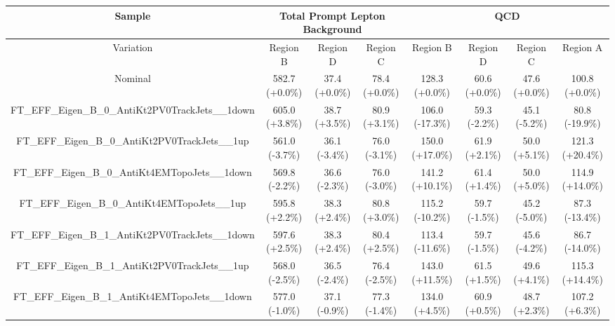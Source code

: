 \begin{table}[htbp!]
\begin{tiny}
\begin{center}
\begin{tabular}{c|c|c|c||c|c|c|c}
Sample                                                          &\multicolumn{3}{c||}{Total Prompt Lepton Background}      &\multicolumn{4}{c}{QCD}                                                  \\
\hline  
Variation                                                       & Region B       & Region D         & Region C           & Region B        & Region D         & Region C          & Region A         \\ 
\hline  
Nominal                                                         & 582.7     (+0.0\%) & 37.4      (+0.0\%) & 78.4      (+0.0\%) & 128.3     (+0.0\%) & 60.6      (+0.0\%) & 47.6      (+0.0\%) & 100.8     (+0.0\%) \\ 
\hline
FT\_EFF\_Eigen\_B\_0\_AntiKt2PV0TrackJets\_\_1down           & 605.0     (+3.8\%) & 38.7      (+3.5\%) & 80.9      (+3.1\%) & 106.0     (-17.3\%) & 59.3      (-2.2\%) & 45.1      (-5.2\%) & 80.8      (-19.9\%) \\ 
FT\_EFF\_Eigen\_B\_0\_AntiKt2PV0TrackJets\_\_1up             & 561.0     (-3.7\%) & 36.1      (-3.4\%) & 76.0      (-3.1\%) & 150.0     (+17.0\%) & 61.9      (+2.1\%) & 50.0      (+5.1\%) & 121.3     (+20.4\%) \\ 
FT\_EFF\_Eigen\_B\_0\_AntiKt4EMTopoJets\_\_1down             & 569.8     (-2.2\%) & 36.6      (-2.3\%) & 76.0      (-3.0\%) & 141.2     (+10.1\%) & 61.4      (+1.4\%) & 50.0      (+5.0\%) & 114.9     (+14.0\%) \\ 
FT\_EFF\_Eigen\_B\_0\_AntiKt4EMTopoJets\_\_1up               & 595.8     (+2.2\%) & 38.3      (+2.4\%) & 80.8      (+3.0\%) & 115.2     (-10.2\%) & 59.7      (-1.5\%) & 45.2      (-5.0\%) & 87.3      (-13.4\%) \\ 
FT\_EFF\_Eigen\_B\_1\_AntiKt2PV0TrackJets\_\_1down           & 597.6     (+2.5\%) & 38.3      (+2.4\%) & 80.4      (+2.5\%) & 113.4     (-11.6\%) & 59.7      (-1.5\%) & 45.6      (-4.2\%) & 86.7      (-14.0\%) \\ 
FT\_EFF\_Eigen\_B\_1\_AntiKt2PV0TrackJets\_\_1up             & 568.0     (-2.5\%) & 36.5      (-2.4\%) & 76.4      (-2.5\%) & 143.0     (+11.5\%) & 61.5      (+1.5\%) & 49.6      (+4.1\%) & 115.3     (+14.4\%) \\ 
FT\_EFF\_Eigen\_B\_1\_AntiKt4EMTopoJets\_\_1down             & 577.0     (-1.0\%) & 37.1      (-0.9\%) & 77.3      (-1.4\%) & 134.0     (+4.5\%) & 60.9      (+0.5\%) & 48.7      (+2.3\%) & 107.2     (+6.3\%) \\ 

\end{tabular}
\end{center}
\end{tiny}
\end{table}
